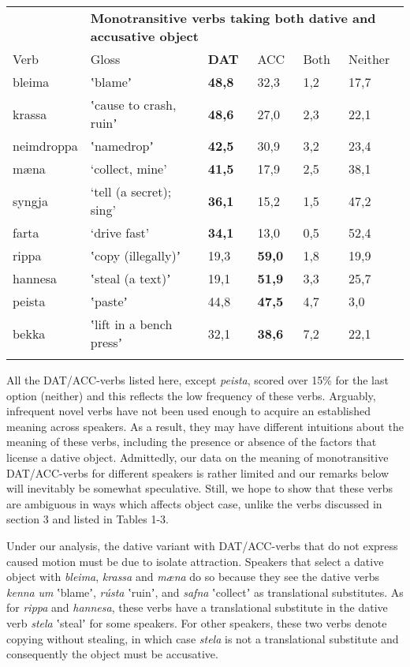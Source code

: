 \tabletail{}
\tablelasttail{}
\begin{tabularx}{\textwidth}{XXXXXX}
\lsptoprule

\multicolumn{1}{X}{{\bfseries \tabref{tab:key:4}:}} & \multicolumn{5}{X}{{\bfseries Monotransitive verbs taking both dative and accusative object} }\\
Verb & Gloss & \textbf{DAT} & ACC & Both & Neither\\
bleima & ʽblameʼ & \textbf{48,8} & 32,3 & 1,2 & 17,7\\
krassa & ʽcause to crash, ruinʼ & \textbf{48,6} & 27,0 & 2,3 & 22,1\\
neimdroppa & ʽnamedropʼ & \textbf{42,5} & 30,9 & 3,2 & 23,4\\
mæna & ‘collect, mine’ & \textbf{41,5} & 17,9 & 2,5 & 38,1\\
syngja & ‘tell (a secret); sing’ & \textbf{36,1} & 15,2 & 1,5 & 47,2\\
farta & ‘drive fast’ & \textbf{34,1} & 13,0 & 0,5 & 52,4\\
rippa & ʽcopy (illegally)ʼ & 19,3 & \textbf{59,0} & 1,8 & 19,9\\
hannesa & ʽsteal (a text)ʼ & 19,1 & \textbf{51,9} & 3,3 & 25,7\\
peista & ʽpasteʼ & 44,8 & \textbf{47,5} & 4,7 & 3,0\\
bekka & ʽlift in a bench pressʼ & 32,1 & \textbf{38,6} & 7,2 & 22,1\\
\lspbottomrule
\end{tabularx}
All the DAT/ACC-verbs listed here, except \textit{peista}, scored over 15\% for the last option (neither) and this reflects the low frequency of these verbs. Arguably, infrequent novel verbs have not been used enough to acquire an established meaning across speakers. As a result, they may have different intuitions about the meaning of these verbs, including the presence or absence of the factors that license a dative object. Admittedly, our data on the meaning of monotransitive DAT/ACC-verbs for different speakers is rather limited and our remarks below will inevitably be somewhat speculative. Still, we hope to show that these verbs are ambiguous in ways which affects object case, unlike the verbs discussed in section 3 and listed in Tables 1-3. 

Under our analysis, the dative variant with DAT/ACC-verbs that do not express caused motion must be due to isolate attraction. Speakers that select a dative object with \textit{bleima}, \textit{krassa} and \textit{mæna} do so because they see the dative verbs \textit{kenna} \textit{um} ʽblameʼ, \textit{rústa} ʽruinʼ, and \textit{safna} ʽcollectʼ as translational substitutes. As for \textit{rippa} and \textit{hannesa}, these verbs have a translational substitute in the dative verb \textit{stela} ʽstealʼ for some speakers. For other speakers, these two verbs denote copying without stealing, in which case \textit{stela} is not a translational substitute and consequently the object must be accusative. 

